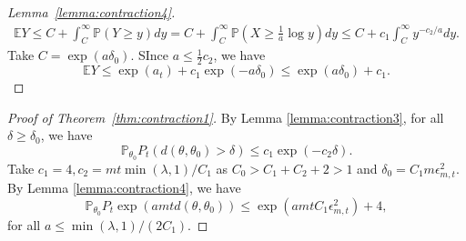 \documentclass[twoside,11pt]{article}
\numberwithin{equation}{section}
\newcommand{\E}{\mathbb{E}}
\newcommand\bP{\mathbb{P}}
\begin{document}
{\begin{proof}[Lemma~\ref{lemma:contraction4}]
\begin{align*}
        \E Y \leq C + \int_C^\infty \bP(Y \geq y) dy = C + \int_C^\infty \bP(X \geq \frac{1}{a} \log y) dy \leq C + c_1 \int_C^\infty y^{-c_2/a} dy. 
    \end{align*}
    Take $C = \exp(a \delta_0)$. SInce $a \leq \frac{1}{2} c_2$, we have 
    \begin{equation*}
        \E Y \leq \exp(a_t) + c_1 \exp(-a\delta_0) \leq \exp(a\delta_0) + c_1. 
    \end{equation*}
\end{proof}
\begin{proof}[Proof of Theorem~\ref{thm:contraction1}]
By Lemma \ref{lemma:contraction3}, for all $\delta \geq \delta_0$, we have
\begin{equation*}
    \bP_{\theta_0} P_t(d(\theta, \theta_0) > \delta) \leq c_1 \exp(-c_2 \delta).  
\end{equation*}
Take $c_1 = 4, c_2 = mt\min(\lambda, 1)/C_1$ as $C_0 > C_1 + C_2 + 2 > 1$ and $\delta_0 = C_1 m \epsilon_{m,t}^2$. By Lemma \ref{lemma:contraction4}, we have
\begin{equation*}
    \bP_{\theta_0} P_t\exp(a mtd(\theta, \theta_0))  \leq \exp(a mt C_1\epsilon_{m,t}^2) + 4,  
\end{equation*}
for all $a \leq \min(\lambda, 1)/(2 C_1)$. 


\end{proof}}
\end{document}
